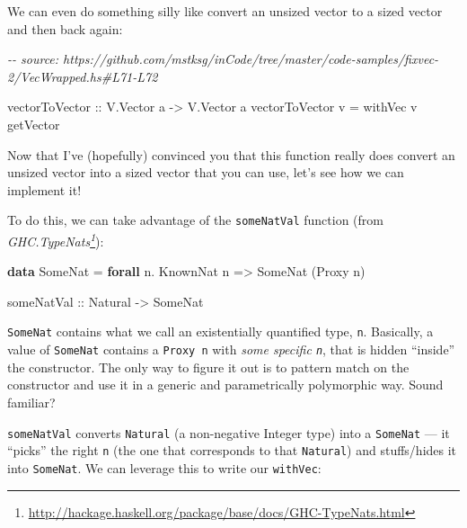 \documentclass[]{article}
\newenvironment{Shaded}{}{}
\newcommand{\CommentTok}[1]{\textcolor[rgb]{0.38,0.63,0.69}{\textit{#1}}}
\newcommand{\DataTypeTok}[1]{\textcolor[rgb]{0.56,0.13,0.00}{#1}}
\newcommand{\KeywordTok}[1]{\textcolor[rgb]{0.00,0.44,0.13}{\textbf{#1}}}
\newcommand{\NormalTok}[1]{#1}
\newcommand{\OperatorTok}[1]{\textcolor[rgb]{0.40,0.40,0.40}{#1}}
\newcommand{\OtherTok}[1]{\textcolor[rgb]{0.00,0.44,0.13}{#1}}
\renewcommand{\href}[2]{#2\footnote{\url{#1}}}
\begin{document}
We can even do something silly like convert an unsized vector to a sized vector
and then back again:

\begin{Shaded}
\begin{Highlighting}[]
\CommentTok{{-}{-} source: https://github.com/mstksg/inCode/tree/master/code{-}samples/fixvec{-}2/VecWrapped.hs\#L71{-}L72}

\OtherTok{vectorToVector ::} \DataTypeTok{V.Vector}\NormalTok{ a }\OtherTok{{-}\textgreater{}} \DataTypeTok{V.Vector}\NormalTok{ a}
\NormalTok{vectorToVector v }\OtherTok{=}\NormalTok{ withVec v getVector}
\end{Highlighting}
\end{Shaded}

Now that I've (hopefully) convinced you that this function really does convert
an unsized vector into a sized vector that you can use, let's see how we can
implement it!

To do this, we can take advantage of the \texttt{someNatVal} function (from
\emph{\href{http://hackage.haskell.org/package/base/docs/GHC-TypeNats.html}{GHC.TypeNats}}):

\begin{Shaded}
\begin{Highlighting}[]
\KeywordTok{data} \DataTypeTok{SomeNat} \OtherTok{=} \KeywordTok{forall}\NormalTok{ n}\OperatorTok{.} \DataTypeTok{KnownNat}\NormalTok{ n }\OtherTok{=\textgreater{}} \DataTypeTok{SomeNat}\NormalTok{ (}\DataTypeTok{Proxy}\NormalTok{ n)}

\OtherTok{someNatVal ::} \DataTypeTok{Natural} \OtherTok{{-}\textgreater{}} \DataTypeTok{SomeNat}
\end{Highlighting}
\end{Shaded}

\texttt{SomeNat} contains what we call an existentially quantified type,
\texttt{n}. Basically, a value of \texttt{SomeNat} contains a \texttt{Proxy\ n}
with \emph{some specific \texttt{n}}, that is hidden ``inside'' the constructor.
The only way to figure it out is to pattern match on the constructor and use it
in a generic and parametrically polymorphic way. Sound familiar?

\texttt{someNatVal} converts \texttt{Natural} (a non-negative Integer type) into
a \texttt{SomeNat} --- it ``picks'' the right \texttt{n} (the one that
corresponds to that \texttt{Natural}) and stuffs/hides it into \texttt{SomeNat}.
We can leverage this to write our \texttt{withVec}:
\end{document}

